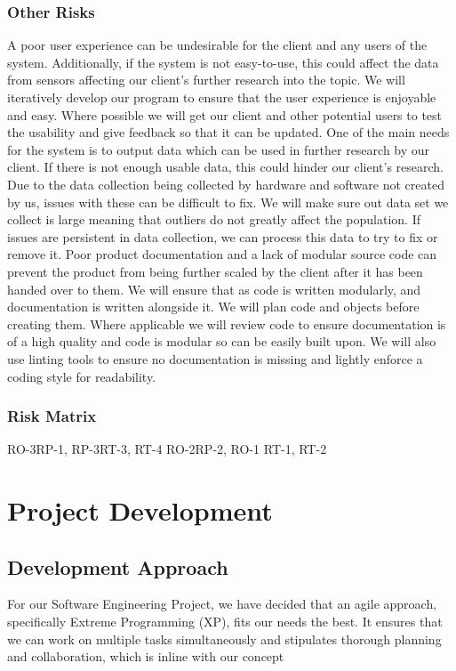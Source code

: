 \documentclass[coverpage,lineno]{../custom}
\begin{document}
\subsubsection{Other Risks}
{A poor user experience can be undesirable for the client and any users of the system. Additionally, if the system is not easy-to-use, this could affect the data from sensors affecting our client’s further research into the topic.}
{We will iteratively develop our program to ensure that the user experience is enjoyable and easy. Where possible we will get our client and other potential users to test the usability and give feedback so that it can be updated.}
{One of the main needs for the system is to output data which can be used in further research by our client. If there is not enough usable data, this could hinder our client’s research.}
{Due to the data collection being collected by hardware and software not created by us, issues with these can be difficult to fix. We will make sure out data set we collect is large meaning that outliers do not greatly affect the population. If issues are persistent in data collection, we can process this data to try to fix or remove it.}
{Poor product documentation and a lack of modular source code can prevent the product from being further scaled by the client after it has been handed over to them.}
{We will ensure that as code is written modularly, and documentation is written alongside it. We will plan code and objects before creating them. Where applicable we will review code to ensure documentation is of a high quality and code is modular so can be easily built upon. We will also use linting tools to ensure no documentation is missing and lightly enforce a coding style for readability.}

\subsubsection{Risk Matrix}

\RiskMatrix
{RO-3}{RP-1, RP-3}{RT-3, RT-4} %
{RO-2}{}{RP-2, RO-1} %
{}{RT-1, RT-2}{} %

\section{Project Development}
\label{sec:dev}

\subsection{Development Approach}
\label{ssec:dev_approach}
For our Software Engineering Project, we have decided that an agile approach, specifically Extreme Programming (XP), fits our needs the best. It ensures that we can work on multiple tasks simultaneously and stipulates thorough planning and collaboration, which is inline with our concept
\end{document}
